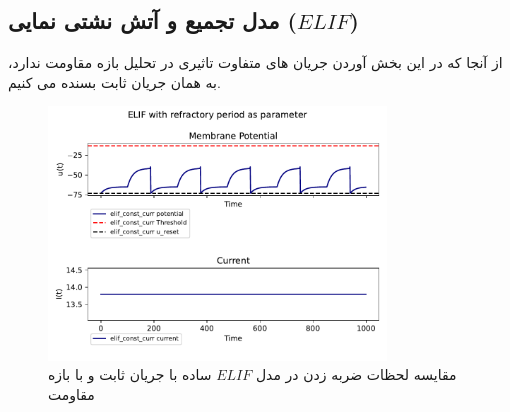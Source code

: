 \documentclass{article}
\begin{document}
        \subsection{مدل تجمیع و آتش نشتی نمایی ($ELIF$)}
            از آنجا که در این بخش آوردن جریان های متفاوت تاثیری در تحلیل بازه مقاومت ندارد، به همان جریان ثابت بسنده می کنیم.
            \begin{figure}[H]
                \centering
                \includegraphics[width=0.8\textwidth]{plots/ELIF with refractory period as parameter.pdf} 
                \caption{مقایسه لحظات ضربه زدن در مدل $ELIF$ ساده با جریان ثابت و با بازه مقاومت}
            \end{figure}
\end{document}
